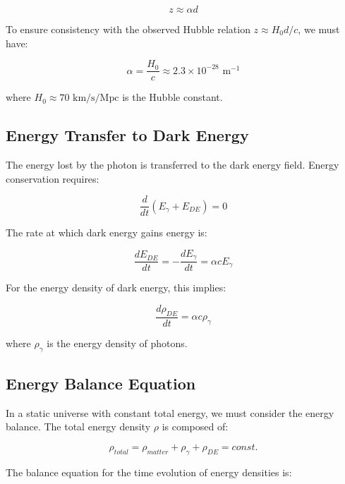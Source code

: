 \documentclass[a4paper,12pt]{article}
\begin{document}
\begin{equation}
	z \approx \alpha d
\end{equation}

To ensure consistency with the observed Hubble relation $z \approx H_0 d/c$, we must have:

\begin{equation}
	\alpha = \frac{H_0}{c} \approx 2.3 \times 10^{-28} \text{ m}^{-1}
\end{equation}

where $H_0 \approx 70 \text{ km/s/Mpc}$ is the Hubble constant.

\subsection{Energy Transfer to Dark Energy}

The energy lost by the photon is transferred to the dark energy field. Energy conservation requires:

\begin{equation}
	\frac{d}{dt}(E_{\gamma} + E_{DE}) = 0
\end{equation}

The rate at which dark energy gains energy is:

\begin{equation}
	\frac{dE_{DE}}{dt} = -\frac{dE_{\gamma}}{dt} = \alpha c E_{\gamma}
\end{equation}

For the energy density of dark energy, this implies:

\begin{equation}
	\frac{d\rho_{DE}}{dt} = \alpha c \rho_{\gamma}
\end{equation}

where $\rho_{\gamma}$ is the energy density of photons.

\subsection{Energy Balance Equation}

In a static universe with constant total energy, we must consider the energy balance. The total energy density $\rho$ is composed of:

\begin{equation}
	\rho_{total} = \rho_{matter} + \rho_{\gamma} + \rho_{DE} = const.
\end{equation}

The balance equation for the time evolution of energy densities is:
\end{document}
